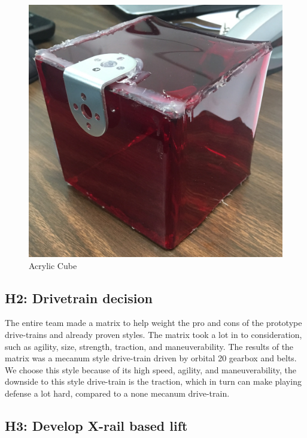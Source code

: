 \documentclass{article}
\begin{document}
\begin{figure}
    \centering
    \includegraphics[width=.6\textwidth]{05_10-01/images/cube.jpg}
    \caption{Acrylic Cube}
    \label{fig:cube}
\end{figure}



\subsection{H2: Drivetrain decision}

The entire team made a matrix to help weight the pro and cons of the prototype drive-trains and already proven styles. The matrix took a lot in to consideration, such as agility, size, strength, traction, and maneuverability. The results of the matrix was a mecanum style drive-train driven by orbital 20 gearbox and belts. We choose this style because of its high speed, agility, and maneuverability, the downside to this style drive-train is the traction, which in turn can make playing defense a lot hard, compared to a none mecanum drive-train.  


\subsection{H3: Develop X-rail based lift}
\end{document}
